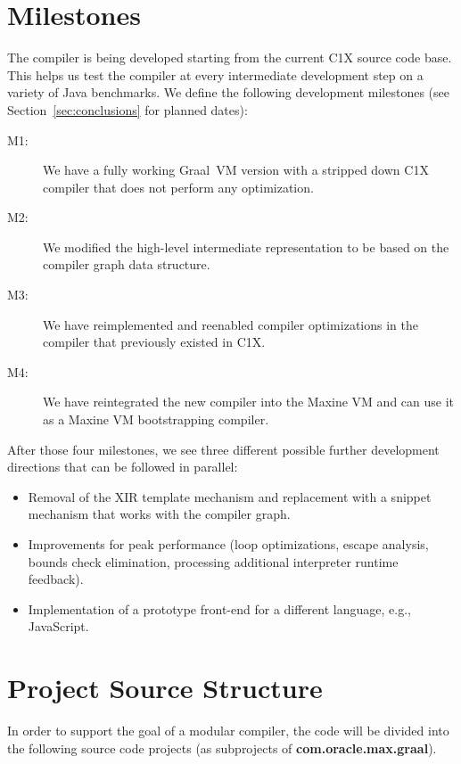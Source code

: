 \documentclass[twocolumn]{svjour3}
\begin{document}
\section{Milestones}
\label{sec:mile}
The compiler is being developed starting from the current C1X source code base.
This helps us test the compiler at every intermediate development step on a variety of Java benchmarks.
We define the following development milestones (see Section~\ref{sec:conclusions} for planned dates):
\begin{description}
\item[M1:] We have a fully working Graal~VM version with a stripped down C1X compiler that does not perform any optimization.
\item[M2:] We modified the high-level intermediate representation to be based on the compiler graph data structure.
\item[M3:] We have reimplemented and reenabled compiler optimizations in the compiler that previously existed in C1X.
\item[M4:] We have reintegrated the new compiler into the Maxine VM and can use it as a Maxine VM bootstrapping compiler.
\end{description}

After those four milestones, we see three different possible further development directions that can be followed in parallel:
\begin{itemize}
  \item Removal of the XIR template mechanism and replacement with a snippet mechanism that works with the compiler graph.
  \item Improvements for peak performance (loop optimizations, escape analysis, bounds check elimination, processing additional interpreter runtime feedback).
  \item Implementation of a prototype front-end for a different language, e.g., JavaScript.
\end{itemize}

\section{Project Source Structure}
In order to support the goal of a modular compiler, the code will be divided into the following source code projects (as subprojects of \textbf{com.oracle.max.graal}).
\end{document}

